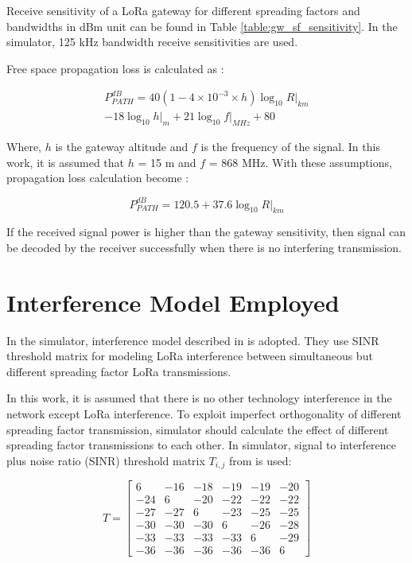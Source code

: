Receive sensitivity of a LoRa gateway for different spreading factors and bandwidths in dBm unit can be found in Table \ref{table:gw_sf_sensitivity}. In the simulator, 125 kHz bandwidth receive sensitivities are used.

Free space propagation loss is calculated as \cite{TR136.942}:

\begin{equation} \label{eq:propagation_loss}
\begin{split}
P^{dB}_{PATH} = 40(1 - 4 \times 10^{-3} \times h){\log_{10} R|_{km}} \\
- 18 {\log_{10} h|_{m}} + 21 {\log_{10} f|_{MHz}} + 80
\end{split}
\end{equation}

Where, $h$ is the gateway altitude and $f$ is the frequency of the signal. In this work, it is assumed that $h$ = 15 m and $f$ = 868 MHz. With these assumptions, propagation loss calculation become \cite{7996384}:

\begin{equation} \label{eq:propagation_loss_simplified}
P^{dB}_{PATH} = 120.5 + 37.6 {\log_{10} R|_{km}}
\end{equation}

If the received signal power is higher than the gateway sensitivity, then signal can be decoded by the receiver successfully when there is no interfering transmission.

\section{Interference Model Employed}

In the simulator, interference model described in \cite{7996384} is adopted. They use SINR threshold matrix for modeling LoRa interference between simultaneous but different spreading factor LoRa transmissions.

In this work, it is assumed that there is no other technology interference in the network except LoRa interference. To exploit imperfect orthogonality of different spreading factor transmission, simulator should calculate the effect of different spreading factor transmissions to each other. In simulator, signal to interference plus noise ratio (SINR) threshold matrix $T_{i,j}$ from \cite{goursaud:hal-01231221} is used:

\begin{equation} \label{eq:sinr}	
T = \begin{bmatrix}	
       6 & -16 & -18 & -19 & -19 & -20 \\	
     -24 &   6 & -20 & -22 & -22 & -22 \\	
     -27 & -27 &   6 & -23 & -25 & -25 \\	
     -30 & -30 & -30 &   6 & -26 & -28 \\	
     -33 & -33 & -33 & -33 &   6 & -29 \\	
     -36 & -36 & -36 & -36 & -36 &   6	
     \end{bmatrix}	
\end{equation}

